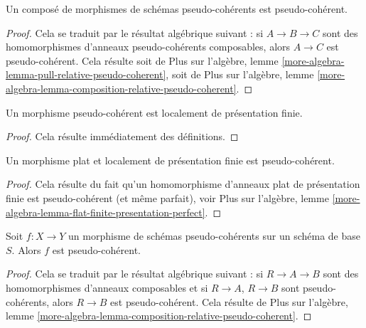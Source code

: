 \begin{lemma}
\label{lemma-composition-pseudo-coherent}
Un composé de morphismes de schémas pseudo-cohérents est
pseudo-cohérent.
\end{lemma}

\begin{proof}
Cela se traduit par le résultat algébrique suivant :
si $A \to B \to C$ sont des homomorphismes d'anneaux pseudo-cohérents composables,
alors $A \to C$ est pseudo-cohérent. Cela résulte soit de
Plus sur l'algèbre,
lemme \ref{more-algebra-lemma-pull-relative-pseudo-coherent},
soit de
Plus sur l'algèbre,
lemme \ref{more-algebra-lemma-composition-relative-pseudo-coherent}.
\end{proof}

\begin{lemma}
\label{lemma-pseudo-coherent-finite-presentation}
Un morphisme pseudo-cohérent est localement de présentation finie.
\end{lemma}

\begin{proof}
Cela résulte immédiatement des définitions.
\end{proof}

\begin{lemma}
\label{lemma-flat-finite-presentation-pseudo-coherent}
Un morphisme plat et localement de présentation finie est pseudo-cohérent.
\end{lemma}

\begin{proof}
Cela résulte du fait qu'un homomorphisme d'anneaux plat de présentation finie est
pseudo-cohérent (et même parfait), voir
Plus sur l'algèbre,
lemme \ref{more-algebra-lemma-flat-finite-presentation-perfect}.
\end{proof}

\begin{lemma}
\label{lemma-permanence-pseudo-coherent}
Soit $f : X \to Y$ un morphisme de schémas pseudo-cohérents
sur un schéma de base $S$. Alors $f$ est pseudo-cohérent.
\end{lemma}

\begin{proof}
Cela se traduit par le résultat algébrique suivant :
si $R \to A \to B$ sont des homomorphismes d'anneaux composables
et si $R \to A$, $R \to B$ sont pseudo-cohérents, alors
$R \to B$ est pseudo-cohérent. Cela résulte de
Plus sur l'algèbre,
lemme \ref{more-algebra-lemma-composition-relative-pseudo-coherent}.
\end{proof}

